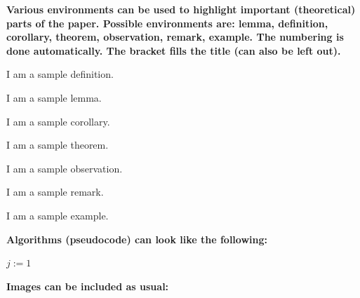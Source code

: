 \textbf{Various environments can be used to highlight important (theoretical)
parts of the paper. Possible environments are: lemma, definition, corollary,
theorem, observation, remark, example. The numbering is done automatically. The
bracket fills the title (can also be left out).}

\begin{definition}
    I am a sample definition.
    \label{def:sample}
\end{definition}

\begin{lemma}
    I am a sample lemma.
    \label{lem:sample}
\end{lemma}

\begin{corollary}
    I am a sample corollary.
    \label{corol:sample}
\end{corollary}

\begin{theorem}
    I am a sample theorem.
    \label{theo:sample}
\end{theorem}

\begin{observation}
    I am a sample observation.
    \label{obs:sample}
\end{observation}

\begin{remark}
    I am a sample remark.
    \label{rem:sample}
\end{remark}

\begin{example}
    I am a sample example.
    \label{exa:sample}
\end{example}

\textbf{Algorithms (pseudocode) can look like the following:}

\begin{algorithm}[ht]
    \DontPrintSemicolon
    \BlankLine
    $j:=1$\;
    \caption{INSERTION-SORT($A$)}
    \label{algo:insertion_sort}
\end{algorithm}

\textbf{Images can be included as usual:}

